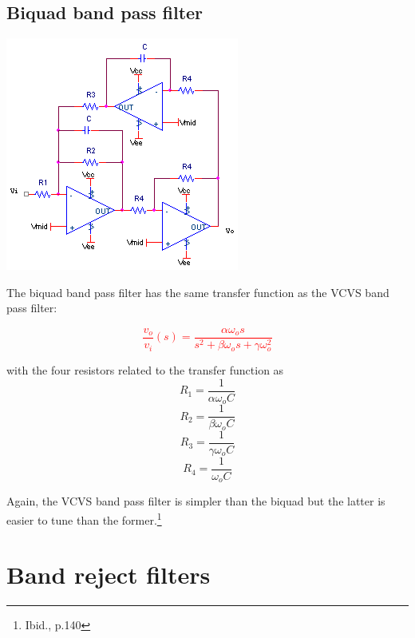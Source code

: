 \subsection{Biquad band pass filter}
\begin{center}
	\includegraphics{schematics/biquad_bandpass.PNG}
\end{center}
The biquad band pass filter has the same transfer function as the VCVS band pass filter:

\textcolor{red}{
\begin{equation}
\frac{v_{o}}{v_{i}}(s) = \frac{\alpha \omega_{o}s}{s^{2}+\beta \omega_{o}s + \gamma \omega_{o}^{2}}
\label{eq:biquad_bandpass}
\end{equation}
}

with the four resistors related to the transfer function as
\begin{equation}
R_{1} = \frac{1}{\alpha \omega_{o}C}
\end{equation}
\begin{equation}
R_{2} = \frac{1}{\beta \omega_{o}C}
\end{equation}
\begin{equation}
R_{3} = \frac{1}{\gamma \omega_{o}C}
\end{equation}
\begin{equation}
R_{4} = \frac{1}{\omega_{o}C}
\end{equation}

Again, the VCVS band pass filter is simpler than the biquad but the latter is easier to tune than the former.\footnote{Ibid., p.140}

\section{Band reject filters}

